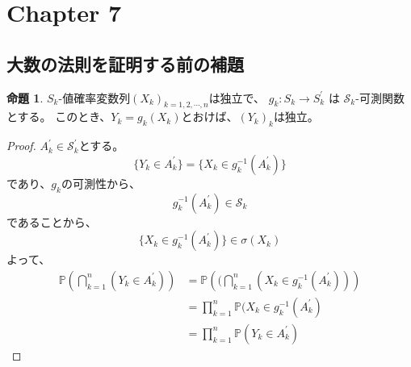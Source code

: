 \documentclass[11pt, a4paper]{jsarticle}
\theoremstyle{definition}
\newtheorem*{prop*}{命題}
\newcommand{\PP}{{\mathbb{P}}} %
\begin{document}
  \section{Chapter 7}
    \subsection{大数の法則を証明する前の補題}
      \begin{prop*}
        $S_k$-値確率変数列$(X_k)_{k = 1,2,\cdots, n}$は独立で、
        $g_k \colon S_k \to S_k^{\prime}$
        は
        $\mathcal{S}_k$-可測関数とする。
        このとき、$Y_k = g_k(X_k)$とおけば、$(Y_k)_k$は独立。
      \end{prop*}
      \begin{proof}
        $A_k^{\prime} \in \mathcal{S}_k^{\prime}$とする。
        \[
          \{Y_k \in A_k^{\prime}\} = \{X_k \in g_k^{-1}(A_k^{\prime})\}
        \]
        であり、$g_k$の可測性から、
        \[
          g_k^{-1}(A_k^{\prime}) \in \mathcal{S}_k
        \]
        であることから、
        \[
          \{X_k \in g_k^{-1}(A_k^{\prime})\} \in \sigma(X_k)
        \]
        よって、
        \begin{align*}
          \PP \left(\bigcap_{k=1}^{n} (Y_k \in A_k^{\prime})\right) &= \PP \left((\bigcap_{k=1}^{n} (X_k \in g_k^{-1}(A_k^{\prime}))\right) \\
          &= \prod_{k=1}^n \PP(X_k \in g_k^{-1}(A_k^{\prime}) \\
          &= \prod_{k=1}^n \PP(Y_k \in A_k^{\prime})
        \end{align*}
      \end{proof}
\end{document}
